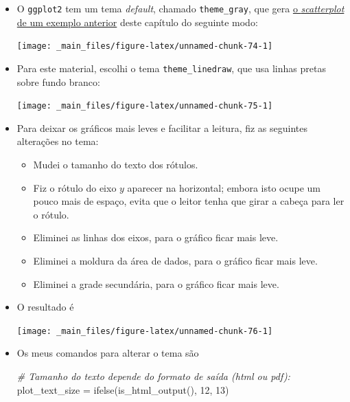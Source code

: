 \documentclass[
  11pt]{report}
\newenvironment{Shaded}{\begin{snugshade}}{\end{snugshade}}
\newcommand{\CommentTok}[1]{\textcolor[rgb]{0.56,0.35,0.01}{\textit{#1}}}
\newcommand{\DecValTok}[1]{\textcolor[rgb]{0.00,0.00,0.81}{#1}}
\newcommand{\FunctionTok}[1]{\textcolor[rgb]{0.00,0.00,0.00}{#1}}
\newcommand{\NormalTok}[1]{#1}
\newcommand{\OtherTok}[1]{\textcolor[rgb]{0.56,0.35,0.01}{#1}}
\renewenvironment{Shaded}{
    \begin{mdframed}[%
      roundcorner=2pt,%
      innerleftmargin=5pt,%
      innerrightmargin=5pt,%
      topline=true,%
      leftline=true,%
      rightline=true,%
      bottomline=true,%
      linewidth=0.5pt,%
      linecolor=black!20,%
      backgroundcolor=black!2,%
      skipabove=2ex,%
      skipbelow=2.5ex%
    ]%
  }
  {
    \end{mdframed}
  }
\begin{document}
\begin{itemize}
\item
  O \texttt{ggplot2} tem um tema \emph{default}, chamado \texttt{theme\_gray}, que gera \protect\hyperlink{grafico4}{o \emph{scatterplot} de um exemplo anterior} deste capítulo do seguinte modo:

  \begin{center}\texttt{[image: \_main\_files/figure-latex/unnamed-chunk-74-1]} \end{center}
\item
  Para este material, escolhi o tema \texttt{theme\_linedraw}, que usa linhas pretas sobre fundo branco:

  \begin{center}\texttt{[image: \_main\_files/figure-latex/unnamed-chunk-75-1]} \end{center}
\item
  Para deixar os gráficos mais leves e facilitar a leitura, fiz as seguintes alterações no tema:

  \begin{itemize}
  \item
    Mudei o tamanho do texto dos rótulos.
  \item
    Fiz o rótulo do eixo $y$ aparecer na horizontal; embora isto ocupe um pouco mais de espaço, evita que o leitor tenha que girar a cabeça para ler o rótulo.
  \item
    Eliminei as linhas dos eixos, para o gráfico ficar mais leve.
  \item
    Eliminei a moldura da área de dados, para o gráfico ficar mais leve.
  \item
    Eliminei a grade secundária, para o gráfico ficar mais leve.
  \end{itemize}
\item
  O resultado é

  \begin{center}\texttt{[image: \_main\_files/figure-latex/unnamed-chunk-76-1]} \end{center}
\item
  Os meus comandos para alterar o tema são

\begin{Shaded}
\begin{Highlighting}[]
\CommentTok{\# Tamanho do texto depende do formato de saída (html ou pdf):}
\NormalTok{plot\_text\_size }\OtherTok{=} \FunctionTok{ifelse}\NormalTok{(}\FunctionTok{is\_html\_output}\NormalTok{(), }\DecValTok{12}\NormalTok{, }\DecValTok{13}\NormalTok{)}


\end{Highlighting}
\end{Shaded}
\end{itemize}
\end{document}

